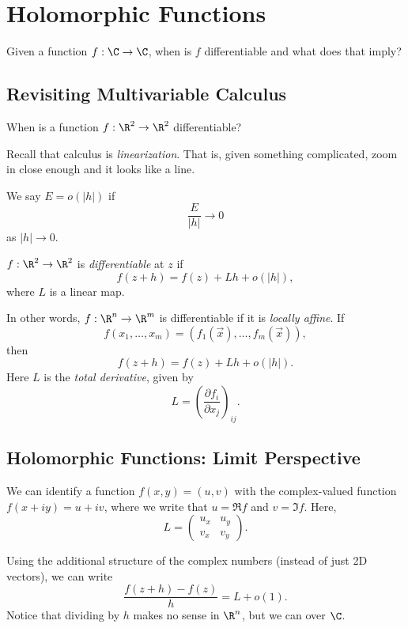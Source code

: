 \chapter{Holomorphic Functions}

Given a function $f : \C \to \C$, when is $f$
differentiable and what does that imply?

\section{Revisiting Multivariable Calculus}
When is a function $f : \R^2 \to \R^2$ differentiable?

Recall that calculus is \textit{linearization}. That is,
given something complicated, zoom in close enough and
it looks like a line.

\begin{tcolorbox}[title=Definition (Little-$o$)]
  We say $E = o(|h|)$ if
  \[\frac{E}{|h|} \to 0\]
  as $|h| \to 0$.
\end{tcolorbox}

\begin{tcolorbox}[title=Definition (Differentiability in $\R^2$)]
  $f : \R^2 \to \R^2$ is \textit{differentiable} at
  $z$ if
  \[f(z + h) = f(z) + Lh + o(|h|),\]
  where $L$ is a linear map.
\end{tcolorbox}

In other words, $f : \R^n \to \R^m$ is differentiable if
it is \textit{locally affine}. If
\[
f(x_1, \dots, x_m) = (f_1(\vec{x}), \dots, f_m(\vec{x}))
,\]
then
\[
f(z + h) = f(z) + Lh + o(|h|)
.\] 
Here $L$ is the \textit{total derivative}, given by
\[
  L = \left(\frac{\partial f_i}{\partial x_j}\right)_{ij}
.\]

\section{Holomorphic Functions: Limit Perspective}
We can identify a function $f(x, y) = (u, v)$ with
the complex-valued function $f(x + iy) = u + iv$, where
we write that $u = \Re f$ and $v = \Im f$. Here,
\[
L =
\left(\begin{matrix}
  u_x & u_y \\
  v_x & v_y
\end{matrix}\right)
.\] 

Using the additional structure of the complex numbers
(instead of just 2D vectors), we can write
\[\frac{f(z + h) - f(z)}{h} = L + o(1).\]
Notice that dividing by $h$ makes no sense in $\R^n$, but
we can over $\C$.

